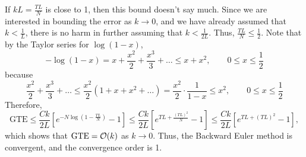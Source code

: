 \documentclass{homework}
\begin{document}
	If $kL = \frac{TL}{N}$ is close to 1, then this bound doesn't say much. Since we are interested in bounding the error as $k \to 0$, and we have already assumed that $k < \frac{1}{L}$, there is no harm in further assuming that $k < \frac{1}{2L}$. Thus, $\frac{TL}{N} \le \frac{1}{2}$. Note that by the Taylor series for $\log(1-x)$,
	\begin{equation*}
		-\log(1-x) = x + \frac{x^2}{2} + \frac{x^3}{3} + \dots \le x + x^2, \qquad 0 \le x \le \frac{1}{2}
	\end{equation*}
	because
	\begin{equation*}
		\frac{x^2}{2} + \frac{x^3}{3} + \dots \le \frac{x^2}{2}\left(1 + x + x^2 + \dots\right) = \frac{x^2}{2}\cdot\frac{1}{1-x} \le x^2, \qquad 0 \le x \le \frac{1}{2}
	\end{equation*}
	Therefore,
	\begin{equation*}
		\text{GTE} \le \frac{Ck}{2L}\left[e^{-N\log\left(1-\frac{TL}{N}\right)} - 1\right] \le \frac{Ck}{2L}\left[e^{TL + \frac{(TL)^2}{N}} - 1\right] \le \frac{Ck}{2L}\left[e^{TL + (TL)^2} - 1\right],
	\end{equation*}
	which shows that $\text{GTE} = \mathcal{O}(k)$ as $k \to 0$. Thus, the Backward Euler method is convergent, and the convergence order is 1.
\end{document}
